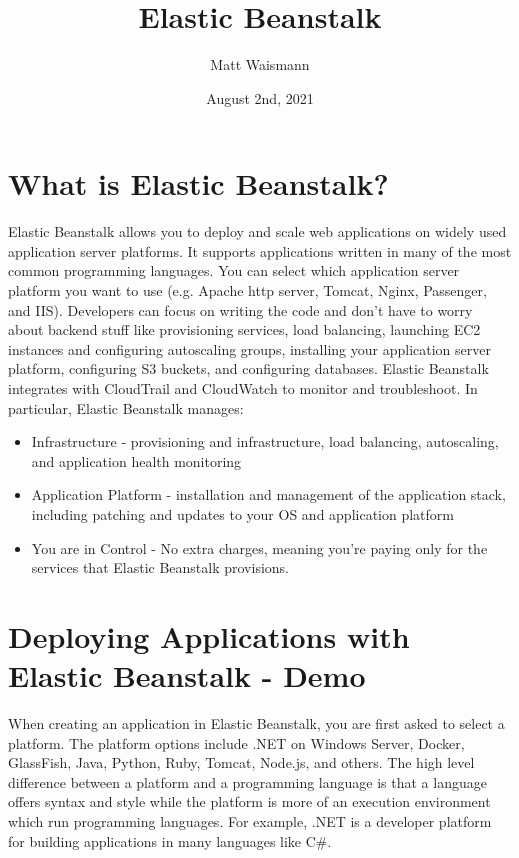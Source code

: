 \documentclass{article}%
\title{Elastic Beanstalk}
\date{August 2nd, 2021}
\author{Matt Waismann}
\begin{document}
\maketitle
\section{What is Elastic Beanstalk?}
Elastic Beanstalk allows you to deploy and scale web applications on widely used application server platforms. It supports applications written in many of the most common programming languages.
You can select which application server platform you want to use (e.g. Apache http server, Tomcat, Nginx, Passenger, and IIS). Developers can focus on writing the code and don't have to worry
about backend stuff like provisioning services, load balancing, launching EC2 instances and configuring autoscaling groups, installing your application server platform, configuring S3 buckets, and configuring databases. 
Elastic Beanstalk integrates with CloudTrail and CloudWatch to monitor and troubleshoot. In particular, Elastic Beanstalk manages:
\begin{itemize}
    \item Infrastructure - provisioning and infrastructure, load balancing, autoscaling, and application health monitoring
    \item Application Platform - installation and management of the application stack, including patching and updates to your OS and application platform
    \item You are in Control - No extra charges, meaning you're paying only for the services that Elastic Beanstalk provisions. 
\end{itemize}

\section{Deploying Applications with Elastic Beanstalk - Demo}
When creating an application in Elastic Beanstalk, you are first asked to select a platform. The platform options include .NET on Windows Server, Docker, GlassFish, Java, Python, Ruby, Tomcat, Node.js, and others. The high level difference between a platform
and a programming language is that a language offers syntax and style while the platform is more of an execution environment which run programming languages. For example, .NET is a developer platform for building applications in many languages like C\#. \\ \\ 
\end{document}
